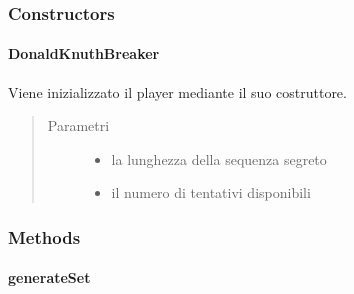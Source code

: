 \documentclass[letterpaper,10pt,italian,openany,oneside]{sphinxmanual}
\begin{document}
\subsubsection{Constructors}
\label{\detokenize{source/it/unicam/cs/pa/mastermind/players/DonaldKnuthBreaker:constructors}}

\paragraph{DonaldKnuthBreaker}
\label{\detokenize{source/it/unicam/cs/pa/mastermind/players/DonaldKnuthBreaker:id1}}

\begin{fulllineitems}
\label{\detokenize{source/it/unicam/cs/pa/mastermind/players/DonaldKnuthBreaker:it.unicam.cs.pa.mastermind.players.DonaldKnuthBreaker.DonaldKnuthBreaker(int, int)}}
Viene inizializzato il player  mediante il suo costruttore.
\begin{quote}\begin{description}
\item[{Parametri}] \leavevmode\begin{itemize}
\item {} 
 \textendash{} la lunghezza della sequenza segreto

\item {} 
 \textendash{} il numero di tentativi disponibili

\end{itemize}

\end{description}\end{quote}

\end{fulllineitems}



\subsubsection{Methods}
\label{\detokenize{source/it/unicam/cs/pa/mastermind/players/DonaldKnuthBreaker:methods}}

\paragraph{generateSet}
\label{\detokenize{source/it/unicam/cs/pa/mastermind/players/DonaldKnuthBreaker:generateset}}
\end{document}

